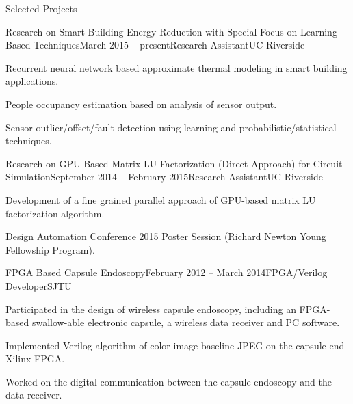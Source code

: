 \documentclass{resume} %
\begin{document}
\begin{rSection}{Selected Projects}


    \begin{rSubsection}{Research on Smart Building Energy Reduction with Special Focus on Learning-Based Techniques}{March 2015 -- present}{Research Assistant}{UC Riverside}

    \item Recurrent neural network based approximate thermal modeling in smart
        building applications.

    \item People occupancy estimation based on analysis of sensor output.

    \item Sensor outlier/offset/fault detection using learning and
        probabilistic/statistical techniques.

    \end{rSubsection}

    \begin{rSubsection}{Research on GPU-Based Matrix LU Factorization (Direct Approach) for Circuit Simulation}{September 2014 -- February 2015}{Research Assistant}{UC Riverside}

    \item Development of a fine grained parallel approach of GPU-based matrix
        LU factorization algorithm.

    \item Design Automation Conference 2015 Poster Session (Richard Newton
        Young Fellowship Program).

    \end{rSubsection}


    \begin{rSubsection}{FPGA Based Capsule Endoscopy}{February 2012 -- March 2014}{FPGA/Verilog Developer}{SJTU}

    \item Participated in the design of wireless capsule endoscopy, including an
        FPGA-based swallow-able electronic capsule, a wireless data receiver and PC
        software.

    \item Implemented Verilog algorithm of color image baseline JPEG on the
        capsule-end Xilinx FPGA.

    \item Worked on the digital communication between the capsule endoscopy and
        the data receiver.


\end{rSubsection}
\end{rSection}
\end{document}
